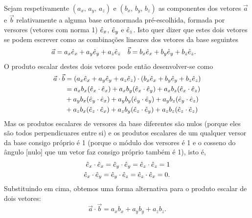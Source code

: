 Sejam respetivamente $(a_x,\,a_y,\,a_z)$ e $(b_x,\,b_y,\,b_z)$ as componentes
dos vetores $\vec a$ e $\vec b$ relativamente a alguma base ortonormada
pré-escolhida, formada por versores (vetores com norma 1) $\hat e_x$, $\hat e_y$ e
$\hat e_z$. Isto quer dizer que estes dois vetores se podem escrever como as
combinações lineares dos vetores da base seguintes
\begin{align*}
  \vec a&=a_x\he_x+a_y\he_y+a_z\he_z&
  \vec b&=b_x\he_x+b_y\he_y+b_z\he_z.
\end{align*}
O produto escalar destes dois vetores pode então desenvolver-se como
\begin{align*}
  \vec a\cdot\vec b&=
  (a_x\he_x+a_y\he_y+a_z\he_z) \cdot (b_x\he_x+b_y\he_y+b_z\he_z)\\
  &=a_xb_x(\he_x\cdot\he_x)+ a_xb_y(\he_x\cdot\he_y)+ a_xb_z(\he_x\cdot\he_z)\\
  &+a_yb_x(\he_y\cdot\he_x)+ a_yb_y(\he_y\cdot\he_y)+ a_yb_z(\he_y\cdot\he_z)\\
  &+a_zb_x(\he_z\cdot\he_x)+ a_zb_y(\he_z\cdot\he_y)+ a_zb_z(\he_z\cdot\he_z)
\end{align*}
Mas os produtos escalares de versores da base diferentes são nulos (porque eles
são todos perpendicuares entre si) e os produtos escalares de um qualquer versor
da base consigo próprio é 1 (porque o módulo dos versores é 1 e o cosseno do
ângulo [nulo] que um vetor faz consigo próprio também é 1), isto é,
\begin{align*}
  \hat e_x\cdot\hat e_x=\hat e_y\cdot\hat e_y=\hat e_z\cdot\hat e_z=1\\
  \hat e_x\cdot\hat e_y=\hat e_y\cdot\hat e_z=\hat e_z\cdot\hat e_x=0.
\end{align*}
Substituindo em cima, obtemos uma forma alternativa para o produto escalar de
dois vetores:
\begin{equation}\label{eq:dprod}
  \vec a\cdot\vec b=a_xb_x+a_yb_y+a_zb_z.
\end{equation}

